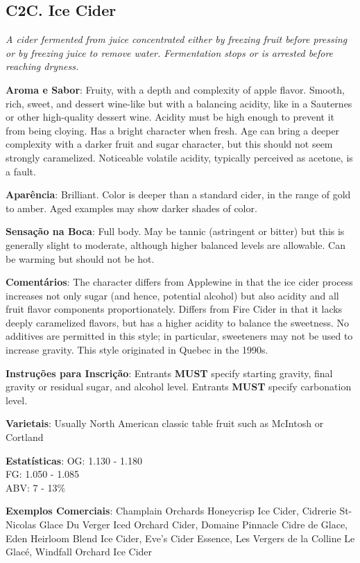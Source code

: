 \subsection*{C2C. Ice Cider}

\textit{A cider fermented from juice concentrated either by freezing fruit before pressing or by freezing juice to remove water. Fermentation stops or is arrested before reaching dryness.}

\textbf{Aroma e Sabor}: Fruity, with a depth and complexity of apple flavor. Smooth, rich, sweet, and dessert wine-like but with a balancing acidity, like in a Sauternes or other high-quality dessert wine. Acidity must be high enough to prevent it from being cloying. Has a bright character when fresh. Age can bring a deeper complexity with a darker fruit and sugar character, but this should not seem strongly caramelized. Noticeable volatile acidity, typically perceived as acetone, is a fault.

\textbf{Aparência}: Brilliant. Color is deeper than a standard cider, in the range of gold to amber. Aged examples may show darker shades of color.

\textbf{Sensação na Boca}: Full body. May be tannic (astringent or bitter) but this is generally slight to moderate, although higher balanced levels are allowable. Can be warming but should not be hot.

\textbf{Comentários}: The character differs from Applewine in that the ice cider process increases not only sugar (and hence, potential alcohol) but also acidity and all fruit flavor components proportionately. Differs from Fire Cider in that it lacks deeply caramelized flavors, but has a higher acidity to balance the sweetness. No additives are permitted in this style; in particular, sweeteners may not be used to increase gravity. This style originated in Quebec in the 1990s.

\textbf{Instruções para Inscrição}: Entrants \textbf{MUST} specify starting gravity, final gravity or residual sugar, and alcohol level. Entrants \textbf{MUST} specify carbonation level.

\textbf{Varietais}: Usually North American classic table fruit such as McIntosh or Cortland

\textbf{Estatísticas}: OG: 1.130 - 1.180 \\
\phantom{ } \hspace{16.5mm} FG: 1.050 - 1.085 \\
\phantom{ } \hspace{16.5mm} ABV: 7 - 13\%

\textbf{Exemplos Comerciais}: Champlain Orchards Honeycrisp Ice Cider, Cidrerie St-Nicolas Glace Du Verger Iced Orchard Cider, Domaine Pinnacle Cidre de Glace, Eden Heirloom Blend Ice Cider, Eve's Cider Essence, Les Vergers de la Colline Le Glacé, Windfall Orchard Ice Cider